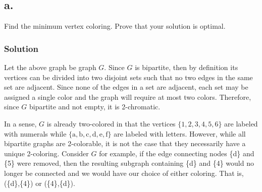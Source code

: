 \documentclass{amsart}
\begin{document}
\begin{figure}[!h]
\end{figure}
\subsection*{a.}
Find the minimum vertex coloring. Prove that your solution is optimal.
\subsubsection*{Solution}
Let the above graph be graph $G$.
Since $G$ is bipartite, then by definition its vertices can be divided into two
disjoint sets such that no two edges in the same set are adjacent.
Since none of the edges in a set are adjacent, each set may be assigned a single
color and the graph will require at most two colors.
Therefore, since $G$ bipartite and not empty, it is 2-chromatic.
\begin{figure}[h]
\end{figure}

In a sense, $G$ is already two-colored in that the vertices $\{1,2,3,4,5,6\}$
are labeled with numerals while
$\{\text{a},\text{b},\text{c},\text{d},\text{e},\text{f}\}$
are labeled with letters.
However, while all bipartite graphs are 2-colorable, it is not the case that
they necessarily have a unique 2-coloring.
Consider $G$ for example, if the edge connecting nodes \{d\} and \{5\} were
removed, then the resulting subgraph containing \{d\} and \{4\} would
no longer be connected and we would have our choice of either coloring.
That is, (\{d\},\{4\}) or (\{4\},\{d\}).
\end{document}

